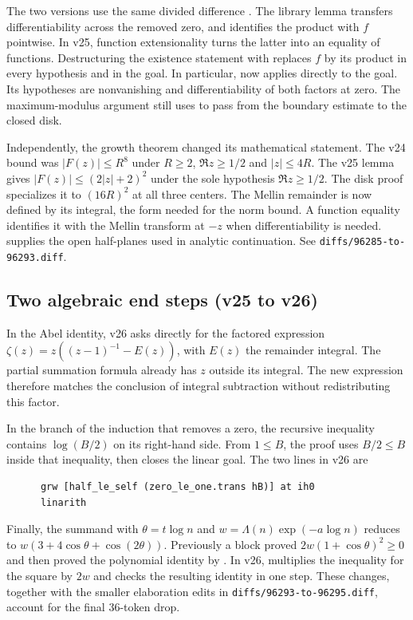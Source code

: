 The two versions use the same divided difference .
The library lemma  transfers
differentiability across the removed zero, and
 identifies the product with \(f\)
pointwise. In v25, function extensionality turns the latter into an
equality of functions. Destructuring the existence statement with
 replaces \(f\) by its product in every hypothesis and in the
goal. In particular,  now applies directly to the
goal. Its hypotheses are nonvanishing and differentiability of both
factors at zero. The maximum-modulus argument still uses
 to pass from the
boundary estimate to the closed disk.

Independently, the growth theorem changed its mathematical statement.
The v24 bound was \(|F(z)|\leq R^8\) under \(R\geq2\),
\(\Re z\geq1/2\) and \(|z|\leq4R\). The v25 lemma gives
\(|F(z)|\leq(2|z|+2)^2\) under the sole hypothesis \(\Re z\geq1/2\).
The disk proof specializes it to \((16R)^2\) at all three centers.
The Mellin remainder is now defined by its integral, the form needed
for the norm bound. A function equality identifies it with the Mellin
transform at \(-z\) when differentiability is needed.
 supplies the open half-planes used in
analytic continuation. See \texttt{diffs/96285-to-96293.diff}.

\subsection{Two algebraic end steps (v25 to v26)}

In the Abel identity, v26 asks directly for the factored expression
\(\zeta(z)=z((z-1)^{-1}-E(z))\), with \(E(z)\) the remainder integral.
The partial summation formula 
already has \(z\) outside its integral. The new expression therefore
matches the conclusion of integral subtraction without redistributing
this factor.

In the branch of the induction that removes a zero, the recursive inequality
 contains \(\log(B/2)\) on its right-hand side. From \(1\leq B\),
the proof uses \(B/2\leq B\) inside that inequality, then closes the
linear goal. The two lines in v26 are
\begin{verbatim}
      grw [half_le_self (zero_le_one.trans hB)] at ih0
      linarith
\end{verbatim}
Finally, the summand with \(\theta=t\log n\) and
\(w=\Lambda(n)\exp(-a\log n)\) reduces to
\(w(3+4\cos\theta+\cos(2\theta))\).
Previously a  block proved \(2w(1+\cos\theta)^2\geq0\) and
then proved the polynomial identity by . In v26,
 multiplies the inequality for the square by
\(2w\) and checks the resulting identity in one step. These changes,
together with the smaller elaboration edits in
\texttt{diffs/96293-to-96295.diff}, account for the final 36-token drop.
